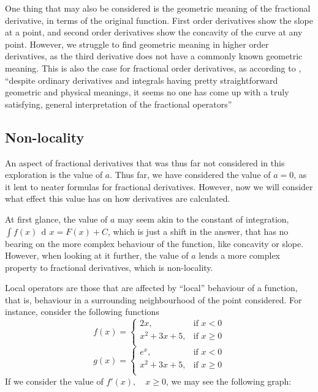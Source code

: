 \documentclass{article}
\DeclareMathOperator{\di}{\,d\!}
\begin{document}
One thing that may also be considered is the geometric meaning of the
fractional derivative, in terms of the original function. First order
derivatives show the slope at a point, and second order derivatives show the
concavity of the curve at any point. However, we struggle to find geometric
meaning in higher order derivatives, as the third derivative does not have a
commonly known geometric meaning. This is also the case for fractional order
derivatives, as according to \parencite{morphocular2022}, ``despite ordinary
derivatives and integrals having pretty straightforward geometric and physical
meanings, it seems no one has come up with a truly satisfying, general
interpretation of the fractional operators''

\subsection{Non-locality} \label{nonlocality}

An aspect of fractional derivatives that was thus far not considered in this
exploration is the value of $a$. Thus far, we have considered the value of
$a=0$, as it lent to neater formulas for fractional derivatives. However, now
we will consider what effect this value has on how derivatives are calculated.

At first glance, the value of $a$ may seem akin to the constant of integration,
$\int f(x) \di x = F(x) + C$, which is just a shift in the answer, that has no
bearing on the more complex behaviour of the function, like concavity or
slope. However, when looking at it further, the value of $a$ lends a more
complex property to fractional derivatives, which is non-locality.

Local operators are those that are affected by ``local'' behaviour of a
function, that is, behaviour in a surrounding neighbourhood of the point
considered. For instance, consider the following functions
$$
	f(x) =
	\begin{cases}
		2x, &\text{if } x < 0 \\

		x^2 + 3x + 5, &\text{if } x \geq 0 \\
	\end{cases}
$$
$$
	g(x) =
	\begin{cases}
		e^x, &\text{if } x < 0 \\

		x^2 + 3x + 5, &\text{if } x \geq 0 \\
	\end{cases}
$$
If we consider the value of $f'(x), \quad x \geq 0$, we may see the following graph:
\end{document}
